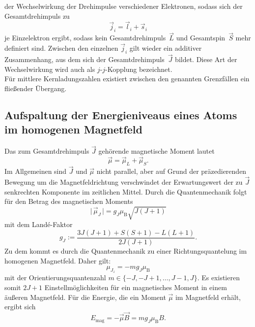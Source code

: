 der Wechselwirkung der Drehimpulse verschiedener Elektronen, sodass sich der Gesamtdrehimpuls zu
\begin{equation}
    \vec{j}_i=\vec{l}_i+\vec{s}_i
\end{equation}
je Einzelektron ergibt, sodass kein Gesamtdrehimpuls~$\vec{L}$ und Gesamtspin~$\vec{S}$ mehr definiert sind.
Zwischen den einzelnen $\vec{j}_i$ gilt wieder ein additiver Zusammenhang, aus dem sich der
Gesamtdrehimpuls~$\vec{J}$ bildet.
Diese Art der Wechselwirkung wird auch als $j$-$j$-Kopplung bezeichnet.\\
\newline
Für mittlere Kernladungszahlen existiert zwischen den genannten Grenzfällen ein fließender Übergang.

\subsection{Aufspaltung der Energieniveaus eines Atoms im homogenen Magnetfeld}
Das zum Gesamtdrehimpuls $\vec{J}$ gehörende magnetische Moment lautet
\begin{equation}
    \vec{\mu}=\vec{\mu}_L+\vec{\mu}_S.
\end{equation}
Im Allgemeinen sind $\vec{J}$ und $\vec{\mu}$ nicht parallel, aber auf Grund der präzedierenden
Bewegung um die Magnetfeldrichtung verschwindet der Erwartungswert der zu $\vec{J}$
senkrechten Komponente im zeitlichen Mittel.
Durch die Quantenmechanik folgt für den Betrag des magnetischen Moments
\begin{equation}
     \lvert\,\vec{\mu}_J\,\rvert=g_J\mu_{\mathup{B}}\sqrt{J(J+1)}
\end{equation}
mit dem Landé-Faktor
\begin{equation}
    g_J:=\frac{3J(J+1)+S(S+1)-L(L+1)}{2J(J+1)}.
    \label{eqn:g_J}
\end{equation}
Zu dem kommt es durch die Quantenmechanik zu einer Richtungsquantelung im homogenen
Magnetfeld. Daher gilt:
\begin{equation}
    \mu_{J_z}=-mg_J\mu_{\mathup{B}}
\end{equation}
mit der Orientierungsquantenzahl $m\in\{-J,-J+1,\ldots,J-1,J\}$.
Es existieren somit $2J+1$ Einstellmöglichkeiten für ein magnetisches Moment in einem äußeren
Magnetfeld.
Für die Energie, die ein Moment $\vec{\mu}$ im Magnetfeld erhält, ergibt sich
\begin{equation}
    E_{\mathup{mag}}=-\vec{\mu}\vec{B}=mg_J\mu_{\mathup{B}}B.
    \label{eqn:E_mag}
\end{equation}
